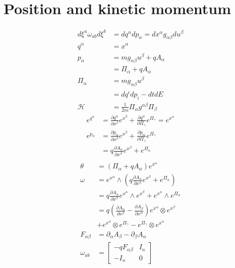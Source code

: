 \documentclass[11pt]{article}
\begin{document}
\section{Position and kinetic momentum}
\begin{equation}
\begin{aligned}
	d\xi^a \omega_{ab} d\xi^b &= dq^\alpha dp_\alpha = dx^\alpha g_{\alpha\beta} du^\beta \\
	q^\alpha &= x^\alpha \\
	p_\alpha &= m g_{\alpha \beta} u^\beta + q A_\alpha \\
	&= \Pi_\alpha + q A_\alpha \\
	\Pi_\alpha &= m g_{\alpha \beta} u^\beta \\
	&= dq^i dp_i - dt dE \\
	\mathcal{H} &= \frac{1}{2m} \Pi_\alpha g^{\alpha\beta} \Pi_\beta 
\end{aligned}
\end{equation}
\begin{equation}
\begin{aligned}
	e^{q^\alpha} &= \frac{\partial q^\alpha}{\partial x^\beta}e^{x^\beta} + \frac{\partial q^\alpha}{\partial \Pi_\gamma}e^{\Pi_\gamma} = e^{x^\alpha} \\
	e^{p_\alpha} &= \frac{\partial p_\alpha}{\partial x^\beta}e^{x^\beta} + \frac{\partial p_\alpha}{\partial \Pi_\gamma}e^{\Pi_\gamma} \\
	&= q \frac{\partial A_\alpha}{\partial x^\beta} e^{x^\beta} +e^{\Pi_\alpha} \\
\end{aligned}
\end{equation}
\begin{equation}
\begin{aligned}
	\theta &= (\Pi_\alpha + q A_\alpha) e^{x^\alpha} \\
	\omega &= e^{x^\alpha} \wedge \left( q \frac{\partial A_\alpha}{\partial x^\beta} e^{x^\beta} +e^{\Pi_\alpha} \right) \\
	&= q \frac{\partial A_\alpha}{\partial x^\beta} e^{x^\alpha} \wedge e^{x^\beta} + e^{x^\alpha} \wedge e^{\Pi_\alpha} \\
	&=  q \left( \frac{\partial A_\alpha}{\partial x^\beta} - \frac{\partial A_\beta}{\partial x^\alpha}\right)  e^{x^\alpha} \otimes e^{x^\beta} \\
	&+ e^{x^\alpha} \otimes e^{\Pi_\gamma} - e^{\Pi_\gamma} \otimes e^{x^\alpha} \\
	F_{\alpha\beta} &= \partial_\alpha A_\beta - \partial_\beta A_\alpha \\
	\omega_{ab} &= \left[ \begin{matrix}
		- q F_{\alpha\beta} & I_n \\[2.2ex]
		- I_n & 0 \end{matrix} \right] \\
\end{aligned}
\end{equation}
\end{document}
